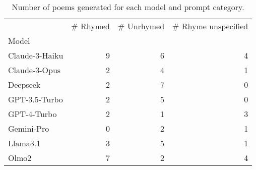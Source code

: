 \begin{table}[H]
  \centering
  \small
  \singlespacing
  \begin{tabular}{lrrr}
  \toprule
   & \# Rhymed & \# Unrhymed & \# Rhyme unspecified \\
  Model &  &  &  \\
  \midrule
  Claude-3-Haiku & 9 & 6 & 4 \\
  Claude-3-Opus & 2 & 4 & 1 \\
  Deepseek & 2 & 7 & 0 \\
  GPT-3.5-Turbo & 2 & 5 & 0 \\
  GPT-4-Turbo & 2 & 1 & 3 \\
  Gemini-Pro & 0 & 2 & 1 \\
  Llama3.1 & 3 & 5 & 1 \\
  Olmo2 & 7 & 2 & 4 \\
  \bottomrule
  \end{tabular}
  \caption{Number of poems generated for each model and prompt category.}
  \label{tab:num_poems_models}
\end{table}
